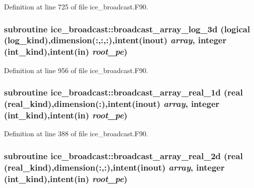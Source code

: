 Definition at line 725 of file ice\_\-broadcast.F90.\hypertarget{namespaceice__broadcast_a7b9a7cb04f157e736b41e8f0fb4f595a}{
\subsubsection[{broadcast\_\-array\_\-log\_\-3d}]{\setlength{\rightskip}{0pt plus 5cm}subroutine ice\_\-broadcast::broadcast\_\-array\_\-log\_\-3d (logical (log\_\-kind),dimension(:,:,:),intent(inout) {\em array}, \/  integer (int\_\-kind),intent(in) {\em root\_\-pe})}}
\label{namespaceice__broadcast_a7b9a7cb04f157e736b41e8f0fb4f595a}


Definition at line 956 of file ice\_\-broadcast.F90.\hypertarget{namespaceice__broadcast_a8d3b349a33e8f578462da5b5506c2b21}{
\subsubsection[{broadcast\_\-array\_\-real\_\-1d}]{\setlength{\rightskip}{0pt plus 5cm}subroutine ice\_\-broadcast::broadcast\_\-array\_\-real\_\-1d (real (real\_\-kind),dimension(:),intent(inout) {\em array}, \/  integer (int\_\-kind),intent(in) {\em root\_\-pe})}}
\label{namespaceice__broadcast_a8d3b349a33e8f578462da5b5506c2b21}


Definition at line 388 of file ice\_\-broadcast.F90.\hypertarget{namespaceice__broadcast_a831b40f3a8d5b4ed01be2eca8a3b4cc7}{
\subsubsection[{broadcast\_\-array\_\-real\_\-2d}]{\setlength{\rightskip}{0pt plus 5cm}subroutine ice\_\-broadcast::broadcast\_\-array\_\-real\_\-2d (real (real\_\-kind),dimension(:,:),intent(inout) {\em array}, \/  integer (int\_\-kind),intent(in) {\em root\_\-pe})}}
\label{namespaceice__broadcast_a831b40f3a8d5b4ed01be2eca8a3b4cc7}


